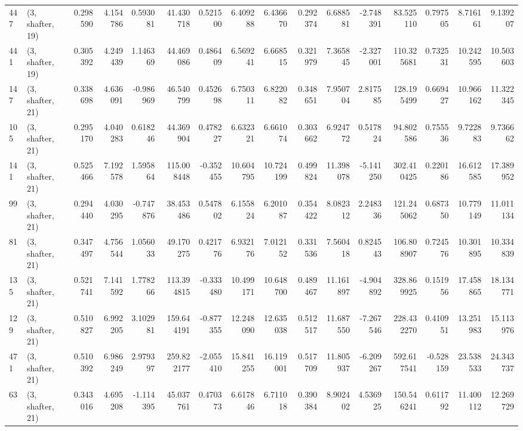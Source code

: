 \begin{tabular}{llrrrrrrrrrrrrrr}
447 &  (3, shafter, 19) &   0.298590 &   4.154786 &   0.593081 &    41.430718 &   0.521500 &   6.409288 &   6.436670 &  0.292374 &   6.688581 &  -2.748391 &     83.525110 &   0.797505 &    8.716161 &    9.139207 \\
441 &  (3, shafter, 19) &   0.305392 &   4.249439 &   1.146369 &    44.469086 &   0.486409 &   6.569241 &   6.668515 &  0.321979 &   7.365845 &  -2.327001 &    110.325681 &   0.732531 &   10.242595 &   10.503603 \\
147 &  (3, shafter, 21) &   0.338698 &   4.636091 &  -0.986969 &    46.540799 &   0.452698 &   6.750311 &   6.822082 &  0.348651 &   7.950704 &   2.817585 &    128.195499 &   0.669427 &   10.966162 &   11.322345 \\
105 &  (3, shafter, 21) &   0.295170 &   4.040283 &   0.618246 &    44.369904 &   0.478227 &   6.632321 &   6.661074 &  0.303662 &   6.924772 &   0.517824 &     94.802586 &   0.755536 &    9.722883 &    9.736662 \\
141 &  (3, shafter, 21) &   0.525466 &   7.192578 &   1.595864 &   115.008448 &  -0.352455 &  10.604795 &  10.724199 &  0.499824 &  11.398078 &  -5.141250 &    302.410425 &   0.220186 &   16.612585 &   17.389952 \\
99  &  (3, shafter, 21) &   0.294440 &   4.030295 &  -0.747876 &    38.453486 &   0.547802 &   6.155824 &   6.201087 &  0.354422 &   8.082312 &   2.248336 &    121.245062 &   0.687350 &   10.779149 &   11.011134 \\
81  &  (3, shafter, 21) &   0.347497 &   4.756544 &   1.056033 &    49.170275 &   0.421776 &   6.932176 &   7.012152 &  0.331536 &   7.560418 &   0.824543 &    106.808907 &   0.724576 &   10.301895 &   10.334839 \\
135 &  (3, shafter, 21) &   0.521741 &   7.141592 &   1.778266 &   113.394815 &  -0.333480 &  10.499171 &  10.648700 &  0.489467 &  11.161897 &  -4.904892 &    328.869925 &   0.151956 &   17.458865 &   18.134771 \\
129 &  (3, shafter, 21) &   0.510827 &   6.992205 &   3.102981 &   159.644191 &  -0.877355 &  12.248090 &  12.635038 &  0.512517 &  11.687550 &  -7.267546 &    228.432270 &   0.410951 &   13.251983 &   15.113976 \\
471 &  (3, shafter, 21) &   0.510392 &   6.986249 &   2.979397 &   259.822177 &  -2.055410 &  15.841255 &  16.119001 &  0.517709 &  11.805937 &  -6.209267 &    592.617541 &  -0.528159 &   23.538533 &   24.343737 \\
63  &  (3, shafter, 21) &   0.343016 &   4.695208 &  -1.114395 &    45.037761 &   0.470373 &   6.617846 &   6.711018 &  0.390384 &   8.902402 &   4.536925 &    150.546241 &   0.611792 &   11.400112 &   12.269729 \\

\end{tabular}
